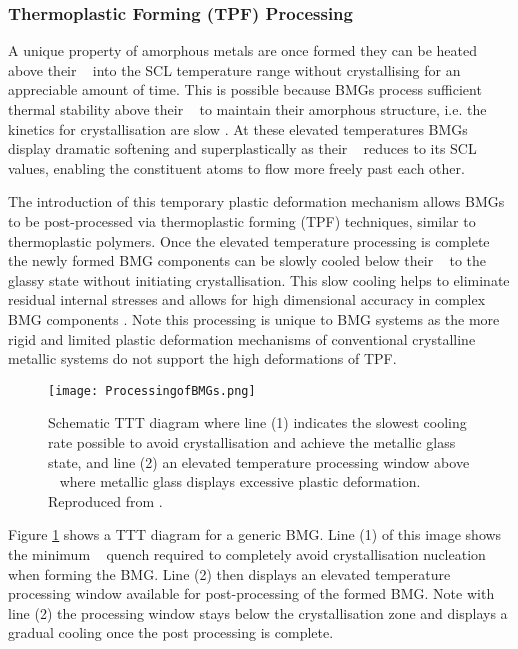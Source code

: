 \documentclass[draft,a4paper,12pt,oneside]{report}%
\begin{document}
\subsubsection{Thermoplastic Forming (TPF) Processing}
A unique property of amorphous metals are once formed they can be heated above their \Tg~ into the SCL temperature range without crystallising for an appreciable amount of time. This is possible because BMGs process sufficient thermal stability above their \Tg~ to maintain their amorphous structure, i.e. the kinetics for crystallisation are slow \cite{Schroers2010}. At these elevated temperatures BMGs display dramatic softening and superplastically as their \n~ reduces to its SCL values, enabling the constituent atoms to flow more freely past each other. 

The introduction of this temporary plastic deformation mechanism allows BMGs to be post-processed via thermoplastic forming (TPF) techniques, similar to thermoplastic polymers. Once the elevated temperature processing is complete the newly formed BMG components can be slowly cooled below their \Tg~  to the glassy state without initiating crystallisation. This slow cooling helps to eliminate residual internal stresses and allows for high dimensional accuracy in complex BMG components \cite{Schroers2010}. Note this processing is unique to BMG systems as the more rigid and limited plastic deformation mechanisms of conventional crystalline metallic systems do not support the high deformations of TPF.

\begin{figure}[htbp]
	\centering
	\texttt{[image: ProcessingofBMGs.png]}
	\caption[BMG TTT Processing]{Schematic TTT diagram where line (1) indicates the slowest cooling rate possible to avoid crystallisation and achieve the metallic glass state, and line (2) an elevated temperature processing window above \Tg~ where metallic glass displays excessive plastic deformation. Reproduced from \cite{Schroers2010}.}
	\label{fig:BMGTTT}
\end{figure}

Figure \ref{fig:BMGTTT} shows a TTT diagram for a generic BMG. Line (1) of this image shows the minimum \Rc~ quench required to completely avoid crystallisation nucleation when forming the BMG. Line (2) then displays an elevated temperature processing window available for post-processing of the formed BMG. Note with line (2) the processing window stays below the crystallisation zone and displays a gradual cooling once the post processing is complete.
\end{document}
